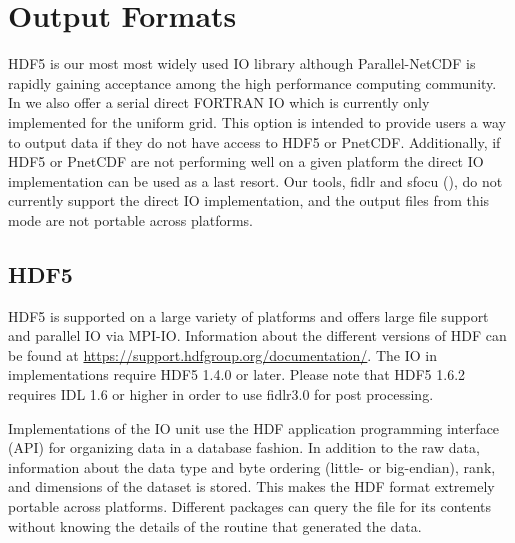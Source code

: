 \begin{comment}
Similarly, the general particle filename is:
\medskip

\texttt{
basename\_$\left\{\begin{array}{c}\mathtt{hdf5}\\ \mathtt{ncmpi}\\
             \end{array}\right\}$\_part\_0000}\enskip,
\medskip

\noindent
where \code{hdf5} or \code{ncmpi} is picked depending on the IO
implementation
used, and the number at the end of the filename is the current value in 
\code{particleFileNumber}.
\end{comment}




\section{Output Formats}\label{Sec:Output formats}


HDF5 is our most most widely used IO library although
Parallel-NetCDF is rapidly gaining acceptance among the high
performance computing community.  In \flashx we also offer a serial
direct FORTRAN IO which is currently only implemented for the
uniform grid.  This option is intended to provide users a way to output data
if they do not have access to HDF5 or PnetCDF.  Additionally,
if HDF5 or PnetCDF are not performing well on a given platform the
direct IO implementation can be used as a last resort.  Our tools,
fidlr and sfocu (), do not currently support the
direct IO implementation, and the output files from this mode are not portable
across platforms.



\subsection{HDF5}
\label{Sec:HDF5}
HDF5%
is supported on a large variety of platforms and
offers large file support and parallel IO via MPI-IO.  Information
about the different versions of HDF can be found at
\url{https://support.hdfgroup.org/documentation/}.
The IO in \flashx
implementations require HDF5 1.4.0 or later.  Please note that HDF5
1.6.2 requires IDL 1.6 or higher in order to use fidlr3.0 for post processing.


Implementations of the %
\unit{IO} unit use the
HDF application programming interface (API) for organizing data in a
database fashion.  In addition to the raw data, information about the
data type and byte ordering (little- or big-endian), rank, and
dimensions of the dataset is stored.  This makes the HDF format
extremely portable across platforms.  Different packages can query the
file for its contents without knowing the details of the routine that
generated the data.



